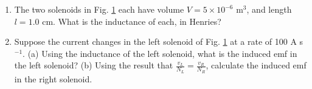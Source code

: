 \documentclass[10pt]{article}
\begin{document}
\begin{enumerate}
\begin{enumerate}
\begin{figure}
\caption{\label{fig:trans} The basic diagram for a \textit{transformer}...No, not Megatron the thing that gives us AC power.}
\end{figure}
In Fig. \ref{fig:trans} (left) a \textit{transformer} is depicted.  The gray square represents an iron core which ensures that the magnitude of the magnetic flux through the left solenoid \textbf{is identical to} the magnetic flux on the right solenoid.  Both solenoids are $L = 5$ cm long.  Suppose the left solenoid has $N_L = 500$ turns, and the right solenoid has $N_R = 1000$ turns.  Let the induced emf in the left solenoid be $v_L$, and the induced emf in the right solenoid be $v_R$.  Show that
\begin{equation}
\frac{v_L}{N_L} = \frac{v_R}{N_R}
\end{equation} \\ \vspace{3cm}
\item The two solenoids in Fig. \ref{fig:trans} each have volume $V = 5 \times 10^{-6}$ m$^3$, and length $l = 1.0$ cm.  What is the inductance of each, in Henries? \\ \vspace{3cm}
\item Suppose the current changes in the left solenoid of Fig. \ref{fig:trans} at a rate of 100 A s$^{-1}$.  (a) Using the inductance of the left solenoid, what is the induced emf in the left solenoid? (b) Using the result that $\frac{v_L}{N_L} = \frac{v_R}{N_R}$, calculate the induced emf in the right solenoid. \\ \vspace{4cm}
\end{enumerate}
\end{enumerate}
\end{document}
